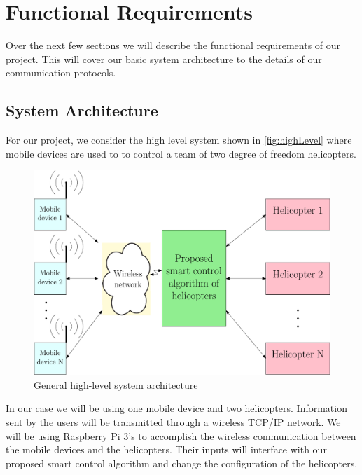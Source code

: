\documentclass[letterpaper, 10pt, conference]{ieeeconf}
\begin{document}

\section{Functional Requirements}

Over the next few sections we will describe the functional requirements of our project.  This will cover our basic system architecture to the details of our communication protocols.

\subsection{System Architecture}
For our project, we consider the high level system shown in \autoref{fig:highLevel} where mobile devices are used to to control a team of two degree of freedom helicopters. 
%
\begin{figure}
  \centering
  \begin{mdframed}[backgroundcolor=yellow!20, roundcorner=7pt,outerlinewidth=1.2pt,outerlinecolor=blue!50]
  \includegraphics[scale=0.31]{figs/ipe/highLevel_yel_grn}
  \end{mdframed}
  \caption{General high-level system architecture}
  \label{fig:highLevel}
\end{figure}
%
In our case we will be using one mobile device and two helicopters.  Information sent by the users will be transmitted through a wireless TCP/IP network.  We will be using Raspberry Pi 3's to accomplish the wireless communication between the mobile devices and the helicopters.  Their inputs will interface with our proposed smart control algorithm and change the configuration of the helicopters.
\end{document}
